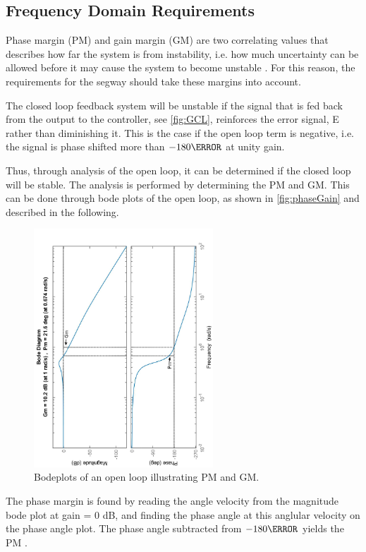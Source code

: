 \subsection{Frequency Domain Requirements}
Phase margin (PM) and gain margin (GM) are two correlating values that describes how far the system is from instability, i.e. how much uncertainty can be allowed before it may cause the system to become unstable \citep{sou:pM}.
For this reason, the requirements for the segway should take these margins into account. %

The closed loop feedback system will be unstable if the signal that is fed back from the output to the controller, see \autoref{fig:GCL}, reinforces the error signal, E rather than diminishing it. This is the case if the open loop term is negative, i.e. the signal is phase shifted more than $-180\degree$ at unity gain.

Thus, through analysis of the open loop, it can be determined if the closed loop will be stable. The analysis is performed by determining the PM and GM. This can be done through bode plots of the open loop, as shown in \autoref{fig:phaseGain} and described in the following.

\begin{figure}[H]
\centering
\includegraphics[width=0.6\textwidth, angle=-90]{figures/PM_GM.pdf}
\caption{Bodeplots of an open loop illustrating PM and GM.}
\label{fig:phaseGain}
\end{figure}
The phase margin is found by reading the angle velocity from the magnitude bode plot at gain = 0 dB, and finding the phase angle at this anglular velocity on the phase angle plot. The phase angle subtracted from $-180\degree$ yields the PM \citep{sou:MC}.

